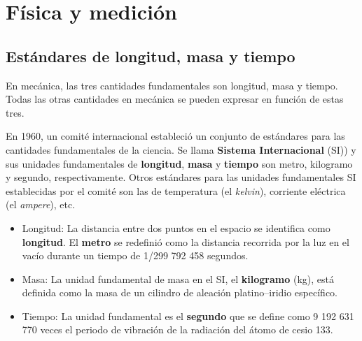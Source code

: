 \section{Física y medición}
  \subsection{Estándares de longitud, masa y tiempo}
    \PN En mecánica, las tres cantidades fundamentales son longitud, masa y tiempo. Todas las otras cantidades en
    mecánica se pueden expresar en función de estas tres.

    \PN En 1960, un comité internacional estableció un conjunto de estándares para las cantidades fundamentales de la
    ciencia. Se llama \textbf{Sistema Internacional} (SI)) y sus unidades fundamentales de \textbf{longitud},
    \textbf{masa} y \textbf{tiempo} son metro, kilogramo y segundo, respectivamente. Otros estándares para las unidades
    fundamentales SI establecidas por el comité son las de temperatura (el \textit{kelvin}), corriente eléctrica (el
    \textit{ampere}), etc.
    \begin{itemize}
      \item Longitud: La distancia entre dos puntos en el espacio se identifica como \textbf{longitud}. El
      \textbf{metro} se redefinió como la distancia recorrida por la luz en el vacío durante un tiempo de 1/299 792 458
      segundos.
      \item Masa: La unidad fundamental de masa en el SI, el \textbf{kilogramo} (kg), está definida como la masa de un
      cilindro de aleación platino–iridio específico.
      \item Tiempo: La unidad fundamental es el \textbf{segundo} que se define como 9 192 631 770 veces el periodo de
      vibración de la radiación del átomo de cesio 133.
    \end{itemize}
